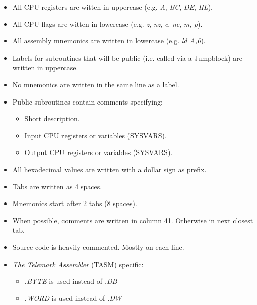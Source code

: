 \documentclass[a4paper,11pt]{article}
\begin{document}
    \begin{itemize}
        \item All CPU registers are witten in uppercase (e.g. \textit{A},
        \textit{BC}, \textit{DE}, \textit{HL}).
        \item All CPU flags are witten in lowercase (e.g. \textit{z},
        \textit{nz}, \textit{c}, \textit{nc}, \textit{m}, \textit{p}).
        \item All assembly mnemonics are written in lowercase (e.g. 
        \textit{ld A,0}).
        \item Labels for subroutines that will be public (i.e. called via a
        Jumpblock) are written in uppercase.
        \item No mnemonics are written in the same line as a label.
        \item Public subroutines contain comments specifying:
        \begin{itemize}
            \item Short description.
            \item Input CPU registers or variables (SYSVARS).
            \item Output CPU registers or variables (SYSVARS).
        \end{itemize}
        \item All hexadecimal values are written with a dollar sign as prefix.
        \item Tabs are written as 4 spaces.
        \item Mnemonics start after 2 tabs (8 spaces).
        \item When possible, comments are written in column 41. Otherwise in
        next closest tab.
        \item Source code is heavily commented. Mostly on each line.
        \item \textit{The Telemark Assembler} (TASM) specific:
        \begin{itemize}
            \item \textit{.BYTE} is used instead of \textit{.DB}
            \item \textit{.WORD} is used instead of \textit{.DW}
        \end{itemize}
    \end{itemize}

    \pagebreak
    
    
\end{document}
